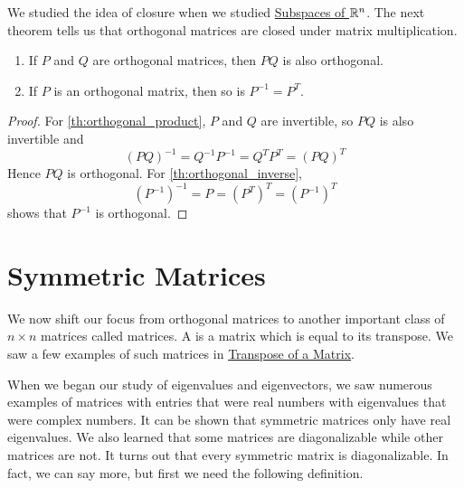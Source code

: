 \documentclass{ximera}
\begin{document}
We studied the idea of closure when we studied \href{https://ximera.osu.edu/oerlinalg/LinearAlgebra/VSP-0020/main}{Subspaces of $\mathbb{R}^n$}.  The next theorem tells us that orthogonal matrices are closed under matrix multiplication.

\begin{theorem}\label{th:orthogonal_product_inverse}
\begin{enumerate}
    \item\label{th:orthogonal_product}
    If $P$ and $Q$ are orthogonal matrices, then $PQ$ is also orthogonal.
    \item\label{th:orthogonal_inverse}
    If $P$ is an orthogonal matrix, then so is $P^{-1} = P^{T}$.
\end{enumerate}

\begin{proof}
For \ref{th:orthogonal_product}, $P$ and $Q$ are invertible, so $PQ$ is also invertible and
\begin{equation*}
(PQ)^{-1} = Q^{-1}P^{-1} = Q^{T}P^{T} = (PQ)^{T}
\end{equation*}
Hence $PQ$ is orthogonal. For \ref{th:orthogonal_inverse},
\begin{equation*}
(P^{-1})^{-1} = P = (P^{T})^{T} = (P^{-1})^{T}
\end{equation*}
shows that $P^{-1}$ is orthogonal.
\end{proof}
\end{theorem}

\section*{Symmetric Matrices}

We now shift our focus from orthogonal matrices to another important class of $n \times n$ matrices called  matrices.  A  is a matrix which is equal to its transpose.  We saw a few examples of such matrices in \href{https://ximera.osu.edu/oerlinalg/LinearAlgebra/MAT-0025/main}{Transpose of a Matrix}.

When we began our study of eigenvalues and eigenvectors, we saw numerous examples of matrices with entries that were real numbers with eigenvalues that were complex numbers.  It can be shown that symmetric matrices only have real eigenvalues.  We also learned that some matrices are diagonalizable while other matrices are not.  It turns out that every symmetric matrix is diagonalizable.  In fact, we can say more, but first we need the following definition.
\end{document}
